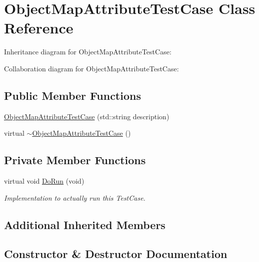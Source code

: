\hypertarget{classObjectMapAttributeTestCase}{}\section{Object\+Map\+Attribute\+Test\+Case Class Reference}
\label{classObjectMapAttributeTestCase}


Inheritance diagram for Object\+Map\+Attribute\+Test\+Case\+:


Collaboration diagram for Object\+Map\+Attribute\+Test\+Case\+:
\subsection*{Public Member Functions}
\begin{DoxyCompactItemize}
\item 
\hyperlink{classObjectMapAttributeTestCase_a8770aa85622fde394d412df64331f4a5}{Object\+Map\+Attribute\+Test\+Case} (std\+::string description)
\item 
virtual \hyperlink{classObjectMapAttributeTestCase_ac80d86f042dcda1f5e861f8e9541e317}{$\sim$\+Object\+Map\+Attribute\+Test\+Case} ()
\end{DoxyCompactItemize}
\subsection*{Private Member Functions}
\begin{DoxyCompactItemize}
\item 
virtual void \hyperlink{classObjectMapAttributeTestCase_abeb179af8a3733a64013d1edd6eda6f9}{Do\+Run} (void)
\begin{DoxyCompactList}\small\item\em Implementation to actually run this Test\+Case. \end{DoxyCompactList}\end{DoxyCompactItemize}
\subsection*{Additional Inherited Members}


\subsection{Constructor \& Destructor Documentation}
